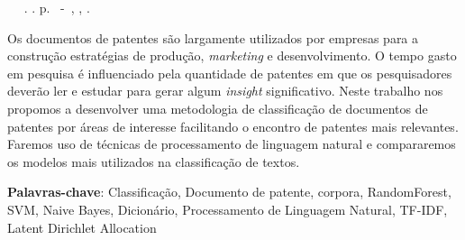 \setlength{\absparsep}{18pt} %
\begin{resumo}
	\begin{flushleft} 
			\setlength{\absparsep}{0pt} %
			\SingleSpacing 
			\imprimirautorabr~ ~\textbf{\imprimirtitulo}.	\imprimirdata. \pageref{LastPage}p. 
			\imprimirtipotrabalho~-~\imprimirinstituicao, \imprimirlocal, \imprimirdata. 
 	\end{flushleft}
\OnehalfSpacing 			
Os documentos de patentes são largamente utilizados por empresas para a construção estratégias de produção, \textit{marketing} e desenvolvimento. O tempo gasto em pesquisa é influenciado pela quantidade de patentes em que os pesquisadores deverão ler e estudar para gerar algum \textit{insight} significativo. Neste trabalho nos propomos a desenvolver uma metodologia de classificação de documentos de patentes por áreas de interesse facilitando o encontro de patentes mais relevantes. Faremos uso de técnicas de processamento de linguagem natural e compararemos os modelos mais utilizados na classificação de textos.
 

 \textbf{Palavras-chave}: Classificação, Documento de patente, corpora, RandomForest, SVM, Naive Bayes, Dicionário, Processamento de Linguagem Natural, TF-IDF, Latent Dirichlet Allocation
\end{resumo}